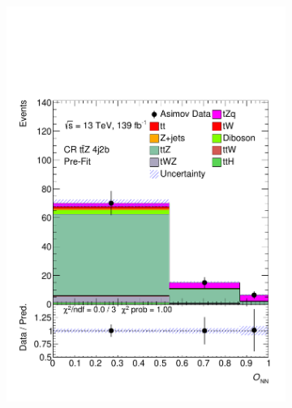 \begin{figure}[!h]
\begin{subfigure}[b]{0.33\linewidth}
    \includegraphics[width=\textwidth]{ubonn-thesis/Chapters/Chapters_07/Figure/Asmiov/CR_4j2b.pdf} 
  \end{subfigure} 
  \begin{subfigure}[b]{0.33\linewidth}
    \centering

\end{subfigure}
\end{figure}
